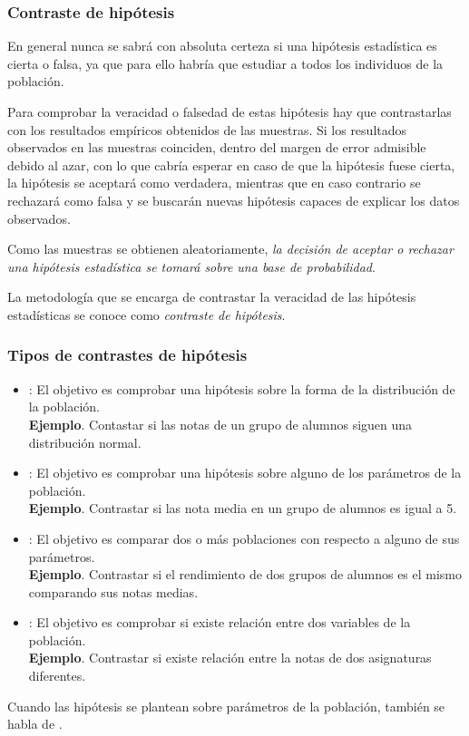 \begin{frame}
\frametitle{Contraste de hipótesis}
En general nunca se sabrá con absoluta certeza si una hipótesis estadística es cierta o falsa, ya que para ello habría
que estudiar a todos los individuos de la población.

\pause
Para comprobar la veracidad o falsedad de estas hipótesis hay que contrastarlas con los resultados empíricos obtenidos
de las muestras.
Si los resultados observados en las muestras coinciden, dentro del margen de error admisible debido al azar, con lo que cabría
esperar en caso de que la hipótesis fuese cierta, la hipótesis se aceptará como verdadera, mientras que en caso
contrario se rechazará como falsa y se buscarán nuevas hipótesis capaces de explicar los datos observados.

\pause
Como las muestras se obtienen aleatoriamente, \alert{\emph{la decisión de aceptar o rechazar una hipótesis estadística se
tomará sobre una base de probabilidad}}.

\pause
La metodología que se encarga de contrastar la veracidad de las hipótesis estadísticas se conoce como \emph{contraste
de hipótesis}.
\end{frame}


\begin{frame}
\frametitle{Tipos de contrastes de hipótesis}
\begin{itemize}[<+->]
\item {}: El objetivo es comprobar una hipótesis sobre la forma de la
distribución de la población.\\
\textbf{Ejemplo}. Contastar si las notas de un grupo de alumnos siguen una distribución normal.
\item {}: El objetivo es comprobar una hipótesis sobre alguno de los parámetros
de la población.\\
\textbf{Ejemplo}. Contrastar si las nota media en un grupo de alumnos es igual a 5.
\item {}: El objetivo es comparar dos o más poblaciones con respecto a alguno de sus
parámetros.\\
\textbf{Ejemplo}. Contrastar si el rendimiento de dos grupos de alumnos es el mismo comparando sus notas medias.
\item {}: El objetivo es comprobar si existe relación entre dos
variables de la población.\\
\textbf{Ejemplo}. Contrastar si existe relación entre la notas de dos asignaturas diferentes.
\end{itemize}

\pause
Cuando las hipótesis se plantean sobre parámetros de la población, también se habla de .
\end{frame}


